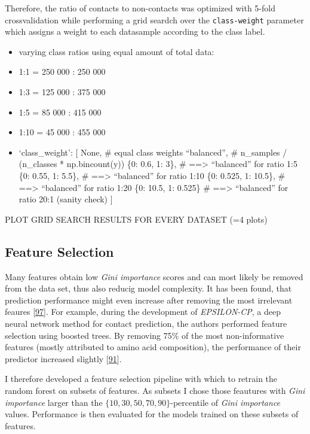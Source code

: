 \documentclass[12pt,a4paper,twoside]{book}
\providecommand{\tightlist}{%
  \setlength{\itemsep}{0pt}\setlength{\parskip}{0pt}}
\theoremstyle{definition}
\theoremstyle{definition}
\theoremstyle{remark}
\begin{document}
Therefore, the ratio of contacts to non-contacts was optimized with
5-fold crossvalidation while performing a grid seardch over the
\texttt{class-weight} parameter which assigns a weight to each
datasample according to the class label.

\begin{itemize}
\tightlist
\item
  varying class ratios using equal amount of total data:
\item
  1:1 = 250 000 : 250 000
\item
  1:3 = 125 000 : 375 000
\item
  1:5 = 85 000 : 415 000
\item
  1:10 = 45 000 : 455 000
\item
  `class\_weight': {[} None, \# equal class weights ``balanced'', \#
  n\_samples / (n\_classes * np.bincount(y)) \{0: 0.6, 1: 3\}, \#
  ==\textgreater{} ``balanced'' for ratio 1:5 \{0: 0.55, 1: 5.5\}, \#
  ==\textgreater{} ``balanced'' for ratio 1:10 \{0: 0.525, 1: 10.5\}, \#
  ==\textgreater{} ``balanced'' for ratio 1:20 \{0: 10.5, 1: 0.525\} \#
  ==\textgreater{} ``balanced'' for ratio 20:1 (sanity check) {]}
\end{itemize}

PLOT GRID SEARCH RESULTS FOR EVERY DATASET (=4 plots)

\subsection{Feature Selection}\label{rf-feature-selection}

Many features obtain low \emph{Gini importance} scores and can most
likely be removed from the data set, thus also reducig model complexity.
It has been found, that prediction performance might even increase after
removing the most irrelevant feaures
{[}\protect\hyperlink{ref-Menze2009}{97}{]}. For example, during the
development of \emph{EPSILON-CP}, a deep neural network method for
contact prediction, the authors performed feature selection using
boosted trees. By removing 75\% of the most non-informative features
(mostly attributed to amino acid composition), the performance of their
predictor increased slightly
{[}\protect\hyperlink{ref-Stahl2017}{91}{]}.

I therefore developed a feature selection pipeline with which to retrain
the random forest on subsets of features. As subsets I chose those
feautures with \emph{Gini importance} larger than the
\(\{10, 30, 50, 70, 90\}\)-percentile of \emph{Gini importance} values.
Performance is then evaluated for the models trained on these subsets of
features.
\end{document}
